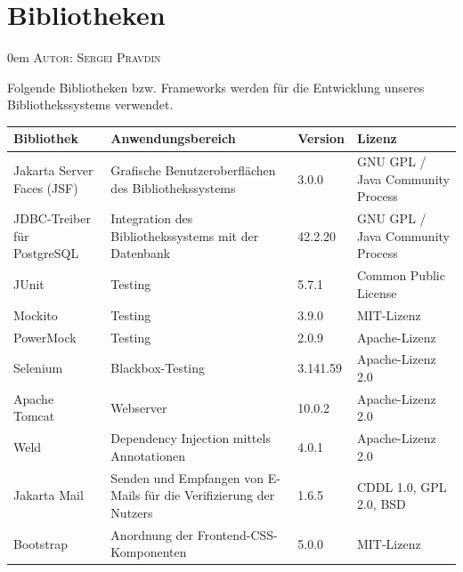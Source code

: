 \documentclass{article}
\makeatletter
\newcommand{\sectionauthor}[1]{
	{\parindent 0em \large \scshape Autor: #1 \par \nobreak \vspace*{1em}}
	\@afterheading
}
\makeatother
\begin{document}


\newpage
\section{Bibliotheken}
\sectionauthor{Sergei Pravdin}

\newenvironment{controls}
{
    \begin{table}[H]
        \centering
        \begin{tabular}{ p{7em} p{19em} p{4em} p{12em} }
            \toprule
            \textbf{Bibliothek} & \textbf{Anwendungsbereich} & \textbf{Version} & \textbf{Lizenz}\\
            \midrule
        }
        {
            \bottomrule
        \end{tabular}
    \end{table}
}

Folgende Bibliotheken bzw. Frameworks werden für die Entwicklung unseres Bibliothekssystems verwendet.

\begin{controls}
    Jakarta Server Faces (JSF) & Grafische Benutzeroberflächen des Bibliothekssystems & 3.0.0 & GNU GPL / Java Community Process\\
    JDBC-Treiber für PostgreSQL & Integration des Bibliothekssystems mit der Datenbank & 42.2.20 & GNU GPL / Java Community Process\\
    JUnit & Testing & 5.7.1 & Common Public License\\
    Mockito & Testing & 3.9.0 & MIT-Lizenz\\
    PowerMock & Testing & 2.0.9 & Apache-Lizenz\\
    Selenium & Blackbox-Testing & 3.141.59 & Apache-Lizenz 2.0\\
    Apache Tomcat & Webserver & 10.0.2 & Apache-Lizenz 2.0\\
    Weld & Dependency Injection mittels Annotationen & 4.0.1 & Apache-Lizenz 2.0\\
    Jakarta Mail & Senden und Empfangen von E-Mails für die Verifizierung der Nutzers & 1.6.5 & CDDL 1.0, GPL 2.0, BSD\\
    Bootstrap & Anordnung der Frontend-CSS-Komponenten & 5.0.0 & MIT-Lizenz\\
\end{controls}
\end{document}
